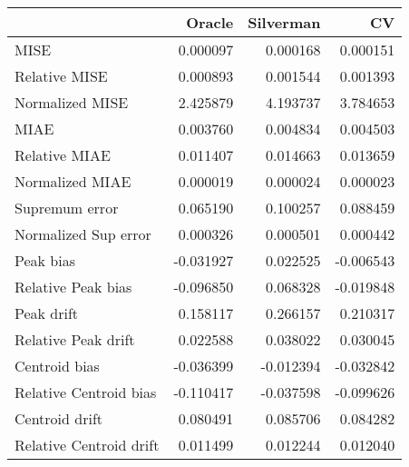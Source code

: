 \begin{tabular}{lrrr}
  \toprule
 & Oracle & Silverman & CV \\ 
  \midrule
MISE & 0.000097 & 0.000168 & 0.000151 \\ 
  Relative MISE & 0.000893 & 0.001544 & 0.001393 \\ 
  Normalized MISE & 2.425879 & 4.193737 & 3.784653 \\ 
  MIAE & 0.003760 & 0.004834 & 0.004503 \\ 
  Relative MIAE & 0.011407 & 0.014663 & 0.013659 \\ 
  Normalized MIAE & 0.000019 & 0.000024 & 0.000023 \\ 
  Supremum error & 0.065190 & 0.100257 & 0.088459 \\ 
  Normalized Sup error & 0.000326 & 0.000501 & 0.000442 \\ 
  Peak bias & -0.031927 & 0.022525 & -0.006543 \\ 
  Relative Peak bias & -0.096850 & 0.068328 & -0.019848 \\ 
  Peak drift & 0.158117 & 0.266157 & 0.210317 \\ 
  Relative Peak drift & 0.022588 & 0.038022 & 0.030045 \\ 
  Centroid bias & -0.036399 & -0.012394 & -0.032842 \\ 
  Relative Centroid bias & -0.110417 & -0.037598 & -0.099626 \\ 
  Centroid drift & 0.080491 & 0.085706 & 0.084282 \\ 
  Relative Centroid drift & 0.011499 & 0.012244 & 0.012040 \\ 
   \bottomrule
\end{tabular}
